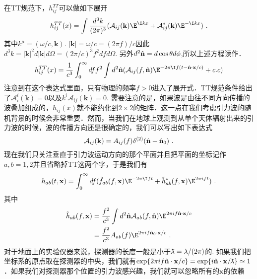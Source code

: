 在TT规范下，$h^{TT}_{ij}$可以做如下展开
\begin{equation}
h^{TT}_{ij}(x) = \int \frac{d^3 k}{(2\pi)^3} (\mathcal A_{ij}(\mathbf k) \E^{\I kx} + \mathcal A_{ij}^* (\mathbf k) \E^{-\I k x} ) ~. 
\end{equation}
其中$k^\mu = (\omega/c,\mathbf k)$. $|\mathbf k| = \omega/c = (2\pi f)/c$因此$d^3 k = |\mathbf k|^2 d|\mathbf k| d\Omega = (2\pi/c)^3 f^2 df d\Omega $. 另外$d^2\hat{\bf{n}} = d\cos\theta d\phi$,所以上述方程读作．
\begin{equation}\label{TTGaug_eq4}
h^{TT}_{ij}(x) = \frac{1}{c^3} \int^\infty_0 df f^2 \int d^2 \hat{ \bf{n} } ( \mathcal A_{ij} (f,\hat{ \bf{n} }) \E^{-2\pi \I f(t-\hat{ {\bf n} } \cdot {\bf x} /c  )}  + {c.c} ) 
\end{equation}
注意到在这个表达式里面，只有物理的频率$f>0$进入了展开式．TT规范条件给出了$\mathcal A^i_i (\mathbf k) =0 $以及$k^i \mathcal A_{ij} (\mathbf k) =0 $. 需要注意的是，如果波是由往不同方向传播的波叠加组成的，$h_{ij}(x)$就不能约化到$2\times 2$的矩阵．这一点在我们考虑引力波的随机背景的时候会非常重要．然而，当我们在地球上观测到从单个天体辐射出来的引力波的时候，波的传播方向还是很确定的，我们可以写出如下表达式
\begin{equation}
\mathcal A_{ij} (\mathbf k) = A_{ij} (f) \delta^{(2)} (\hat{  \mathbf n } - \hat{ {\bf n} }_0 )~.
\end{equation}
现在我们只关注垂直于引力波运动方向的那个平面并且把平面的坐标记作$a,b = 1,2$并且省略掉TT这两个字，于是我们有
\begin{equation}
h_{ab} (t,\mathbf x ) = \int^\infty_0 df ( \tilde f_{ab} (f,\mathbf x) \E^{-2\pi \I f t} + \tilde h^*_{ab} (f,\mathbf x) \E^{2\pi i f t} ) ~. 
\end{equation}
其中
\begin{equation}
\begin{aligned}
\tilde h_{ab} (f,\mathbf x) & = \frac{f^2}{c^3} \int d^2 \hat{  \mathbf n } \mathcal A_{ab} (f, \hat{\mathbf{n}}) \E^{2\pi i f \hat{  \mathbf n } \cdot \mathbf x / c  } \\
& = \frac{f^2}{c^3} A_{ab} (f) \E^{2\pi i f {\hat{\mathbf n}_0 \cdot \mathbf x /c  } }~.
\end{aligned}
\end{equation} 
对于地面上的实验仪器来说，探测器的长度一般是小于${\mkern0.7mu {\bar{\phantom{a}}} \mkern -11mu\lambda} = \lambda/(2\pi)$的. 如果我们把坐标系的原点取在探测器的中央，我们就有$\exp  \{   2\pi i f \hat{ \mathbf n } \cdot \mathbf x/c \} = \exp \{ i \hat{ {\bf n} } \cdot \mathbf x / {\mkern0.75mu {\bar{\phantom{a}}} \mkern -11.75mu\lambda} \} \simeq 1  $．如果我们对探测器那个位置的引力波感兴趣，我们就可以忽略所有的$\mathbf x$的依赖

